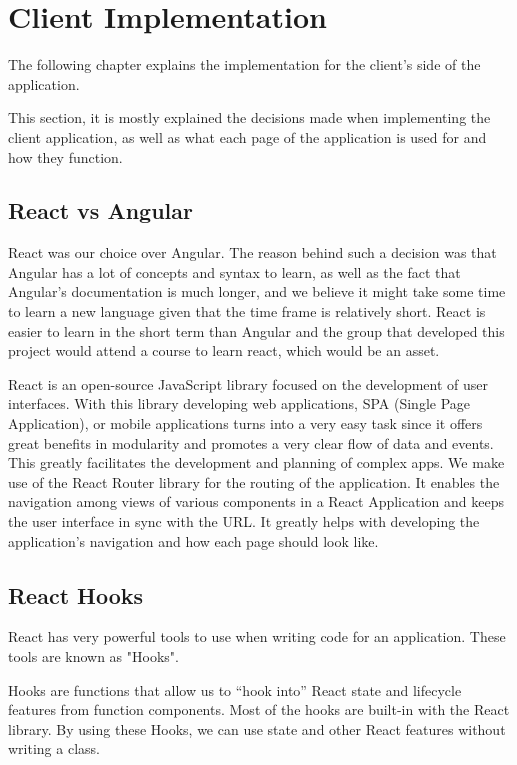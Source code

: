 \documentclass[a4paper,twoside,10pt]{report}
\begin{document}
\chapter{Client Implementation}
The following chapter explains the implementation for the client’s side of the application. 

This section, it is mostly explained the decisions made when implementing the client application, as well as what each page of the application is used for and how they function.
 
\section{React vs Angular}
React was our choice over Angular. The reason behind such a decision was that Angular has a lot of concepts and syntax to learn, as well as the fact that Angular's documentation is much longer, and we believe it might take some time to learn a new language given that the time frame is relatively short. React is easier to learn in the short term than Angular and the group that developed this project would attend a course to learn react, which would be an asset.

React is an open-source JavaScript library focused on the development of user interfaces. With this library developing web applications, SPA (Single Page Application), or mobile applications turns into a very easy task since it offers great benefits in modularity and promotes a very clear flow of data and events. This greatly facilitates the development and planning of complex apps.
We make use of the React Router library for the routing of the application. It enables the navigation among views of various components in a React Application and keeps the user interface in sync with the URL. It greatly helps with developing the application's navigation and how each page should look like.

\section{React Hooks}
React has very powerful tools to use when writing code for an application. These tools are known as "Hooks".

Hooks are functions that allow us to “hook into” React state and lifecycle features from function components. Most of the hooks are built-in with the React library. By using these Hooks, we can use state and other React features without writing a class.
\end{document}
